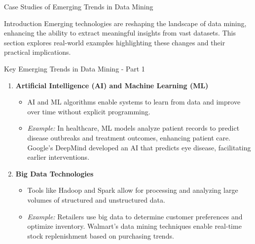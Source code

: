 \documentclass[aspectratio=169]{beamer}
\begin{document}
\begin{frame}[fragile]{Case Studies of Emerging Trends in Data Mining}
    \begin{block}{Introduction}
        Emerging technologies are reshaping the landscape of data mining, enhancing the ability to extract meaningful insights from vast datasets. This section explores real-world examples highlighting these changes and their practical implications.
    \end{block}
\end{frame}

\begin{frame}[fragile]{Key Emerging Trends in Data Mining - Part 1}
    \begin{enumerate}
        \item \textbf{Artificial Intelligence (AI) and Machine Learning (ML)}
            \begin{itemize}
                \item AI and ML algorithms enable systems to learn from data and improve over time without explicit programming.
                \item \textit{Example:} In healthcare, ML models analyze patient records to predict disease outbreaks and treatment outcomes, enhancing patient care. Google's DeepMind developed an AI that predicts eye disease, facilitating earlier interventions.
            \end{itemize}
        
        \item \textbf{Big Data Technologies}
            \begin{itemize}
                \item Tools like Hadoop and Spark allow for processing and analyzing large volumes of structured and unstructured data.
                \item \textit{Example:} Retailers use big data to determine customer preferences and optimize inventory. Walmart's data mining techniques enable real-time stock replenishment based on purchasing trends.
            \end{itemize}
    \end{enumerate}
\end{frame}
\end{document}

